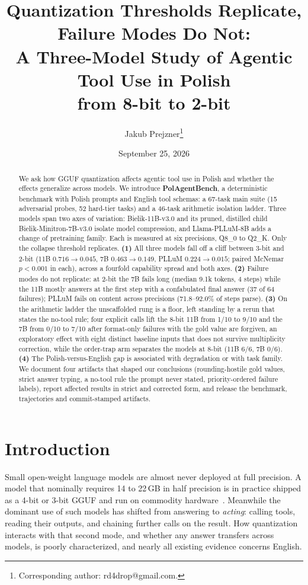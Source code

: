 \documentclass[11pt]{article}
\title{\textbf{Quantization Thresholds Replicate,\\ Failure Modes Do Not:\\
A Three-Model Study of Agentic Tool Use in Polish\\ from 8-bit to 2-bit}}
\author[1]{Jakub Prejzner\thanks{Corresponding author: rd4drop@gmail.com.}}
\affil[1]{Independent Researcher}
\date{September 25, 2026}
\begin{document}
\maketitle

\begin{abstract}
\noindent
We ask how GGUF quantization affects agentic tool use in Polish and whether the effects generalize across models. We introduce \textbf{PolAgentBench}, a deterministic benchmark with Polish prompts and English tool schemas: a 67-task main suite (15 adversarial probes, 52 hard-tier tasks) and a 46-task arithmetic isolation ladder. Three models span two axes of variation: Bielik-11B-v3.0 and its pruned, distilled child Bielik-Minitron-7B-v3.0 isolate model compression, and Llama-PLLuM-8B adds a change of pretraining family. Each is measured at six precisions, Q8\_0 to Q2\_K. Only the collapse threshold replicates. \textbf{(1)} All three models fall off a cliff between 3-bit and 2-bit (11B $0.716 \to 0.045$, 7B $0.463 \to 0.149$, PLLuM $0.224 \to 0.015$; paired McNemar $p<0.001$ in each), across a fourfold capability spread and both axes. \textbf{(2)} Failure modes do not replicate: at 2-bit the 7B fails long (median 9.1k tokens, 4 steps) while the 11B mostly answers at the first step with a confabulated final answer (37 of 64 failures); PLLuM fails on content across precisions (71.8--92.0\% of steps parse). \textbf{(3)} On the arithmetic ladder the unscaffolded rung is a floor, left standing by a rerun that states the no-tool rule; four explicit calls lift the 8-bit 11B from 1/10 to 9/10 and the 7B from 0/10 to 7/10 after format-only failures with the gold value are forgiven, an exploratory effect with eight distinct baseline inputs that does not survive multiplicity correction, while the order-trap arm separates the models at 8-bit (11B 6/6, 7B 0/6). \textbf{(4)} The Polish-versus-English gap is associated with degradation or with task family. We document four artifacts that shaped our conclusions (rounding-hostile gold values, strict answer typing, a no-tool rule the prompt never stated, priority-ordered failure labels), report affected results in strict and corrected form, and release the benchmark, trajectories and commit-stamped artifacts.
\end{abstract}

\section{Introduction}

Small open-weight language models are almost never deployed at full precision. A model that nominally requires 14 to 22\,GB in half precision is in practice shipped as a 4-bit or 3-bit GGUF and run on commodity hardware~\cite{llamacpp,quantsurvey}. Meanwhile the dominant use of such models has shifted from answering to \emph{acting}: calling tools, reading their outputs, and chaining further calls on the result. How quantization interacts with that second mode, and whether any answer transfers across models, is poorly characterized, and nearly all existing evidence concerns English.
\end{document}
